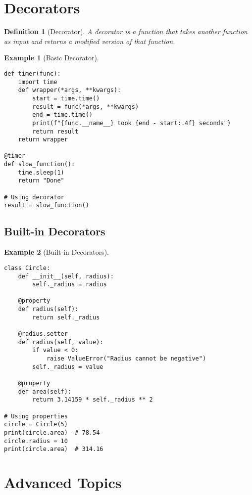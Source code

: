 \documentclass[11pt]{article}
\newtheorem{definition}{Definition}[section]
\newtheorem{example}{Example}[section]
\begin{document}
\section{Decorators}

\begin{definition}[Decorator]
A decorator is a function that takes another function as input and returns a modified version of that function.
\end{definition}

\begin{example}[Basic Decorator]
\begin{lstlisting}
def timer(func):
    import time
    def wrapper(*args, **kwargs):
        start = time.time()
        result = func(*args, **kwargs)
        end = time.time()
        print(f"{func.__name__} took {end - start:.4f} seconds")
        return result
    return wrapper

@timer
def slow_function():
    time.sleep(1)
    return "Done"

# Using decorator
result = slow_function()
\end{lstlisting}
\end{example}

\subsection{Built-in Decorators}

\begin{example}[Built-in Decorators]
\begin{lstlisting}
class Circle:
    def __init__(self, radius):
        self._radius = radius
    
    @property
    def radius(self):
        return self._radius
    
    @radius.setter
    def radius(self, value):
        if value < 0:
            raise ValueError("Radius cannot be negative")
        self._radius = value
    
    @property
    def area(self):
        return 3.14159 * self._radius ** 2

# Using properties
circle = Circle(5)
print(circle.area)  # 78.54
circle.radius = 10
print(circle.area)  # 314.16
\end{lstlisting}
\end{example}

\section{Advanced Topics}
\end{document}
